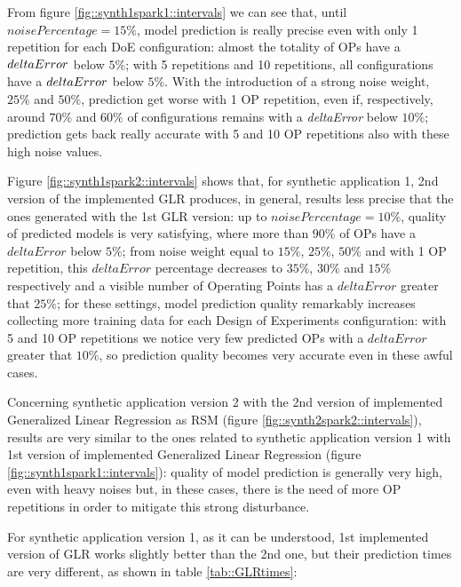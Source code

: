 From figure \ref{fig::synth1spark1::intervals} we can see that, until $noisePercentage = 15\%$, model prediction is really precise even with only 1 repetition for each DoE configuration: almost the totality of OPs have a $del\-ta\-Er\-ror$ below $5\%$; with 5 repetitions and 10 repetitions, all configurations have a $del\-ta\-Er\-ror$ below $5\%$. With the introduction of a strong noise weight, $25\%$ and $50\%$, prediction get worse with 1 OP repetition, even if, respectively, around $70\%$ and $60\%$ of configurations remains with a \textit{deltaError} below $10\%$; prediction gets back really accurate with 5 and 10 OP repetitions also with these high noise values.

Figure \ref{fig::synth1spark2::intervals} shows that, for synthetic application 1, 2nd version of the implemented GLR produces, in general, results less precise that the ones generated with the 1st GLR version: up to $noisePercentage = 10\%$, quality of predicted models is very satisfying, where more than $90\%$ of OPs have a $deltaError$ below $5\%$; from noise weight equal to $15\%$, $25\%$, $50\%$ and with 1 OP repetition, this $deltaError$ percentage decreases to $35\%$, $30\%$ and $15\%$ respectively and a visible number of Operating Points has a $deltaError$ greater that $25\%$; for these settings, model prediction quality remarkably increases collecting more training data for each Design of Experiments configuration: with 5 and 10 OP repetitions we notice very few predicted OPs with a $deltaError$ greater that $10\%$, so prediction quality becomes very accurate even in these awful cases.

Concerning synthetic application version 2 with the 2nd version of implemented Generalized Linear Regression as RSM (figure \ref{fig::synth2spark2::intervals}), results are very similar to the ones related to synthetic application version 1 with 1st version of implemented Generalized Linear Regression (figure \ref{fig::synth1spark1::intervals}): quality of model prediction is generally very high, even with heavy noises but, in these cases, there is the need of more OP repetitions in order to mitigate this strong disturbance.

For synthetic application version 1, as it can be understood, 1st implemented version of GLR works slightly better than the 2nd one, but their prediction times are very different, as shown in table \ref{tab::GLRtimes}:

